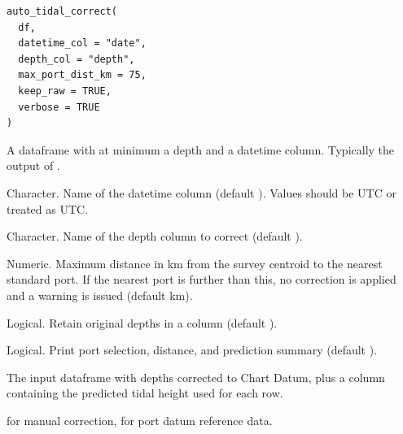\documentclass[a4paper]{book}
\begin{document}
%
\begin{Usage}
\begin{verbatim}
auto_tidal_correct(
  df,
  datetime_col = "date",
  depth_col = "depth",
  max_port_dist_km = 75,
  keep_raw = TRUE,
  verbose = TRUE
)
\end{verbatim}
\end{Usage}
%
\begin{Arguments}
\begin{ldescription}
\item[\code{df}] A dataframe with at minimum a depth and a datetime column.
Typically the output of .

\item[\code{datetime\_col}] Character. Name of the datetime column (default
). Values should be UTC or treated as UTC.

\item[\code{depth\_col}] Character. Name of the depth column to correct
(default ).

\item[\code{max\_port\_dist\_km}] Numeric. Maximum distance in km from the survey
centroid to the nearest standard port. If the nearest port is further
than this, no correction is applied and a warning is issued
(default  km).

\item[\code{keep\_raw}] Logical. Retain original depths in a  column
(default ).

\item[\code{verbose}] Logical. Print port selection, distance, and prediction
summary (default ).
\end{ldescription}
\end{Arguments}
%
\begin{Value}
The input dataframe with depths corrected to Chart Datum, plus
a  column containing the predicted tidal height
used for each row.
\end{Value}
%
\begin{SeeAlso}
 for manual correction,
 for port datum reference data.
\end{SeeAlso}
%
\begin{Examples}
\end{Examples}
\end{document}
